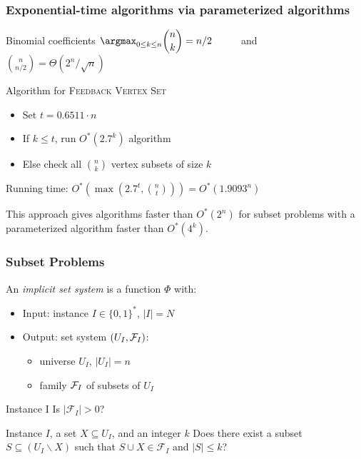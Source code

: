 \begin{frame}
	\frametitle{Exponential-time algorithms via parameterized algorithms}
	
	\begin{block}{Binomial coefficients}
		$\displaystyle \argmax_{0\le k\le n} \binom{n}{k} = n/2$ ~~~~~and~~~~~
		$\displaystyle \binom{n}{n/2} = \Theta(2^n/\sqrt{n})$
	\end{block}
	
	\pause
	\begin{block}{Algorithm for \textsc{Feedback Vertex Set}}
		\begin{itemize}
			\item Set $t= 0.6511\cdot n$
			\item If $k\le t$, run $O^*(2.7^k)$ algorithm
			\item Else check all $\displaystyle \binom{n}{k}$ vertex subsets of size $k$
		\end{itemize}
	\end{block}
	
	Running time: $\displaystyle O^*\left(\max \left( 2.7^t, \binom{n}{t} \right)\right) = O^*(1.9093^n)$
	
	\pause
	\noindent
	This approach gives algorithms faster than $O^*(2^n)$ for subset problems with a parameterized algorithm faster than $O^*(4^k)$.
	
\end{frame}


\begin{frame}[c]\frametitle{Subset Problems}
    
    \begin{block}{}
    An \textit{implicit set system} is a function $\Phi$ with:
    \begin{itemize}
        \item Input: instance $I \in \{0,1\}^*$, $|I| = N$
        \item Output: set system $(U_I, \mathcal{F}_I)$:
        \begin{itemize}
            \item universe $U_I$, $|U_I| = n$
            \item family $\mathcal{F}_I$ of subsets of $U_I$
        \end{itemize}
    \end{itemize}
    \end{block}
    \pause
    \pbDefNoPara{\phisub}
                {Instance I}
                {Is $|\mathcal{F}_I| > 0$?}

    \pause
    \pbDefNoPara{\phiext}
                {Instance $I$, a set $X \subseteq U_I$, and an integer $k$}
                {Does there exist a subset $S \subseteq (U_I \backslash X)$ such that $S \cup X \in \mathcal{F}_I$ and $|S| \leq k$?}

\end{frame}

